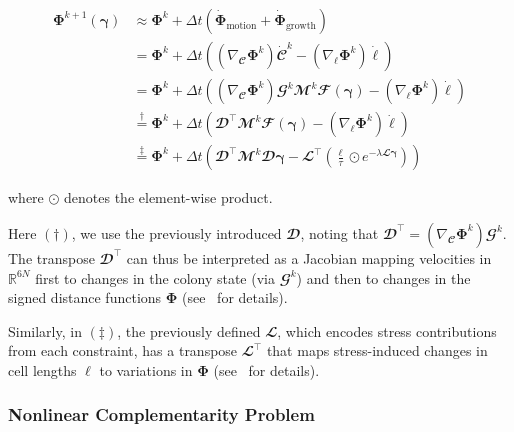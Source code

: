 \documentclass[a4paper,fleqn]{cas-dc}
\begin{document}
{\small
\begin{equation}\label{eq:phi_expanded}
    \begin{split}
        \mathbf{\Phi}^{k+1}(\boldsymbol{\gamma}) & \approx \mathbf{\Phi}^k + \Delta t \left( \dot{\mathbf{\Phi}}_{\text{motion}} + \dot{\mathbf{\Phi}}_{\text{growth}} \right)\\
        & = \mathbf{\Phi}^k + \Delta t \left( (\nabla_{\mathbfcal{C}} \mathbf{\Phi}^k) \dot{\mathbfcal{C}}^k - (\nabla_{\boldsymbol{\ell}} \mathbf{\Phi}^k) \dot{\boldsymbol{\ell}} \right)\\
        & = \mathbf{\Phi}^k + \Delta t \left( (\nabla_{\mathbfcal{C}} \mathbf{\Phi}^k) \mathbfcal{G}^k \mathbfcal{M}^k  \mathbfcal{F}(\boldsymbol{\gamma}) - (\nabla_{\boldsymbol{\ell}} \mathbf{\Phi}^k) \dot{\boldsymbol{\ell}} \right)\\
        & \overset{\dagger}{=}
        \mathbf{\Phi}^k + \Delta t \left( \mathbfcal{D}^\top \mathbfcal{M}^k  \mathbfcal{F}(\boldsymbol{\gamma})
        - (\nabla_{\boldsymbol{\ell}} \mathbf{\Phi}^k) \dot{\boldsymbol{\ell}} \right)\\
        & \overset{\ddagger}{=} \mathbf{\Phi}^k + \Delta t \left( \mathbfcal{D}^\top \mathbfcal{M}^k \mathbfcal{D} \boldsymbol{\gamma} - \mathbfcal{L}^\top \left(\frac{\boldsymbol{\ell}}{\tau} \odot e^{-\lambda \mathbfcal{L} \boldsymbol{\gamma}} \right)\right)
    \end{split}
\end{equation}
}

\noindent where $\odot$ denotes the element-wise product.

Here $(\dagger)$, we use the previously introduced $\mathbfcal{D}$, noting that $\mathbfcal{D}^\top = (\nabla_{\mathbfcal{C}} \mathbf{\Phi}^k) \mathbfcal{G}^k$. The transpose $\mathbfcal{D}^\top$ can thus be interpreted as a Jacobian mapping velocities in $\mathbb{R}^{6N}$ first to changes in the colony state (via $\mathbfcal{G}^k$) and then to changes in the signed distance functions $\mathbf{\Phi}$ (see~\cite{Weady2024SM, Tasora2008,Yan_2020} for details).

Similarly, in $(\ddagger)$, the previously defined $\mathbfcal{L}$, which encodes stress contributions from each constraint, has a transpose $\mathbfcal{L}^\top$ that maps stress-induced changes in cell lengths $\boldsymbol{\ell}$ to variations in $\mathbf{\Phi}$ (see~\cite{Weady2024SM} for details).

\subsubsection{Nonlinear Complementarity Problem}
\end{document}
